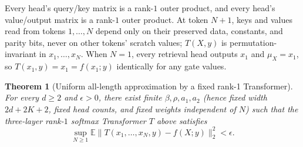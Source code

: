 \documentclass[11pt]{article}
\theoremstyle{plain}
\newtheorem{theorem}{Theorem}
\theoremstyle{definition}
\theoremstyle{remark}
\begin{document}
Every head's query/key matrix is a rank-$1$ outer product, and every head's value/output matrix is a rank-$1$ outer product.
At token $N + 1$, keys and values read from tokens $1, \dots, N$ depend only on their preserved data, constants, and parity bits, never on other tokens' scratch values; $T(X, y)$ is permutation-invariant in $x_1, \dots, x_N$.
When $N = 1$, every retrieval head outputs $x_1$ and $\mu_X = x_1$, so $T(x_1, y) = x_1 = f(x_1; y)$ identically for any gate values.

\begin{theorem}[Uniform all-length approximation by a fixed rank-1 Transformer]\label{thm:main}
For every $d \ge 2$ and $\epsilon > 0$, there exist finite $\beta, \rho, a_1, a_2$ (hence fixed width $2d + 2K + 2$, fixed head counts, and fixed weights independent of $N$) such that the three-layer rank-$1$ softmax Transformer $T$ above satisfies
\[
\sup_{N \ge 1} \mathbb{E}\bigl\|T(x_1, \dots, x_N, y) - f(X; y)\bigr\|_2^2 < \epsilon.
\]
\end{theorem}
\end{document}
